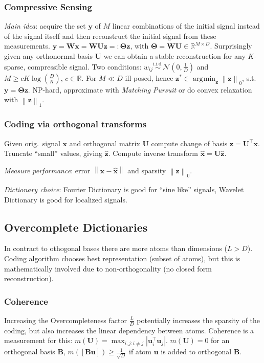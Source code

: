 \documentclass[11pt,a4paper,technote]{IEEEtran}
\DeclareMathOperator*{\argmin}{\arg\!\min}
\newcommand{\abs}[1]{\left\lvert#1\right\rvert}
\newcommand{\norm}[1]{\left\lVert#1\right\rVert}
\newcommand{\matr}[1]{\boldsymbol{\mathbf{#1}}}
\newcommand{\vect}[1]{\boldsymbol{\mathbf{#1}}}
\newcommand{\trns}[1]{#1^{\top}}
\newcommand{\normal}{\mathcal{N}}
\newcommand{\R}{\mathbb{R}}
\begin{document}
\subsubsection*{Compressive Sensing}
\emph{Main idea}: acquire the set $\vect{y}$ of $M$ linear combinations
of the initial signal instead of the signal itself and then
reconstruct the initial signal from these measurements. $\vect{y} =
\matr{W}\vect{x} = \matr{W}\matr{U}\vect{z} =: \matr{\Theta}\vect{z}$,
with $\matr{\Theta} = \matr{W}\matr{U} \in \R^{M \times D}$.
Surprisingly given any orthonormal basis $\matr{U}$ we can obtain a
stable reconstruction for any $K$-sparse, compressible signal. Two
conditions: $w_{ij} \stackrel{\text{i.i.d.}}{\sim} \normal(0,\frac{1}{D})$ and
$M \geq cK\log(\frac{D}{K})$, $c\in\R$. For $M \ll D$ ill-posed, hence
$\vect{z}^*\in \argmin_{\vect{z}} \norm{\vect{z}}_0$, s.t.\ $\vect{y} =
\matr{\Theta}\vect{\vect{z}}$. NP-hard, approximate with \emph{Matching Pursuit}
or do convex relaxation with $\norm{\vect{z}}_1$.

\subsubsection*{Coding via orthogonal transforms} Given orig.\ signal $\vect{x}$
and orthogonal matrix $\matr{U}$ compute change of basis $\vect{z} =
\trns{\matr{U}} \vect{x}$. Truncate ``small'' values, giving $\hat{\vect{z}}$.
Compute inverse transform $\hat{\vect{x}} = \matr{U}\hat{\vect{z}}$.

\emph{Measure performance}: error $\norm{\vect{x}-\hat{\vect{x}}}$ and sparsity
$\norm{\vect{z}}_0$.

\emph{Dictionary choice}: Fourier Dictionary is good for ``sine like'' signals,
Wavelet Dictionary is good for localized signals.

\subsection*{Overcomplete Dictionaries}
In contract to othogonal bases there are more atoms than dimensions ($L > D$).
Coding algorithm chooses best representation (subset of atoms), but this is
mathematically involved due to non-orthogonality (no closed form reconstruction).

\subsubsection*{Coherence}
Increasing the Overcompleteness factor $\frac L D$ potentially increases the
sparsity of the coding, but also increases the linear dependency between atoms.
Coherence is a measurement for this: $m(\matr{U}) = \max_{i,j:i\neq j}
\abs{\trns{\vect{u}_i} \vect{u}_j}$. $m(\matr{U}) = 0$ for an orthogonal basis
$\matr{B}$, $m([\matr{B}\vect{u}]) \geq \frac{1}{\sqrt{D}}$ if atom $\vect{u}$
is added to orthogonal $\matr{B}$.
\end{document}

